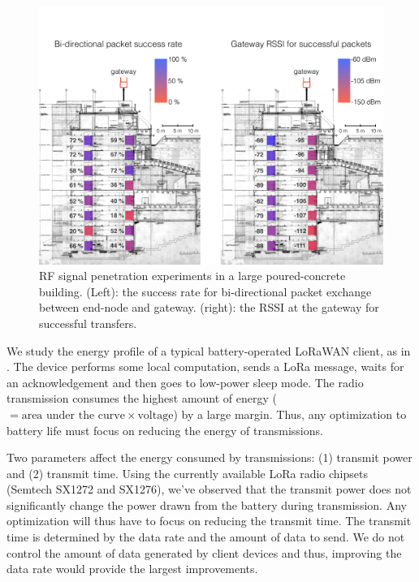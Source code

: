\begin{figure}[!htb]
\centering
\includegraphics[width=\columnwidth]{figures/penetration_test_wean_cropped}
\caption{RF signal penetration experiments in a large poured-concrete building. (Left): the success rate for bi-directional packet exchange between end-node and gateway. (right): the RSSI at the gateway for successful transfers.}
\label{fig:penetration-test}
\compactimg
\end{figure}


We study the energy profile of a typical battery-operated LoRaWAN client, as
in . The device performs some local computation, sends a
LoRa message, waits for an acknowledgement and then goes to low-power sleep
mode. The radio transmission consumes the highest amount of energy ($=
\text{area under the curve} \times \text{voltage}$) by a large margin. Thus,
any optimization to battery life must focus on reducing the energy of
transmissions.

Two parameters affect the energy consumed by transmissions: (1) transmit power
and (2) transmit time. Using the currently available LoRa radio chipsets
(Semtech SX1272 and SX1276), we've observed that the transmit power does not
significantly change the power drawn from the battery during transmission. Any
optimization will thus have to focus on reducing the transmit time. The
transmit time is determined by the data rate and the amount of data to send.
We do not control the amount of data generated by client devices and thus,
improving the data rate would provide the largest improvements.

